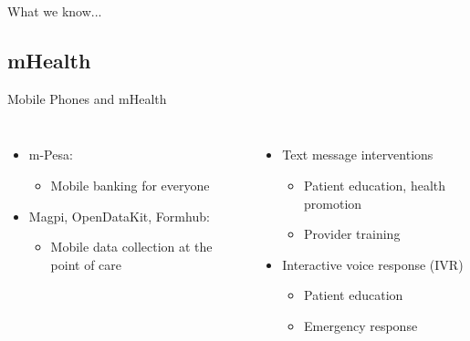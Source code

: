 \documentclass[xcolor=x11names, handout, compress]{beamer}
\renewcommand{\(}{\begin{columns}}
\renewcommand{\)}{\end{columns}}
\newcommand{\<}[1]{\begin{column}{#1}}
\renewcommand{\>}{\end{column}}
\begin{document}
\begin{frame}{What we know...}


\end{frame}

\subsection{mHealth}
\begin{frame}[t]{Mobile Phones and mHealth}
\begin{columns}[T]
\column{2in}
\begin{itemize}
	\item<1->{m-Pesa:}
		\begin{itemize}
		\item<1->{Mobile banking for everyone}
		\end{itemize}
	\item<2->{Magpi, OpenDataKit, Formhub:}
		\begin{itemize}
		\item<2->{Mobile data collection at the point of care}
		\end{itemize}
\end{itemize}
\column{2in}
\begin{itemize}
	\item<3->{Text message interventions}
		\begin{itemize}
		\item<3->{Patient education, health promotion}
		\item<3->{Provider training}
		\end{itemize}
	\item<4->{Interactive voice response (IVR)}
		\begin{itemize}
		\item<4->{Patient education}
		\item<4->{Emergency response}
		\end{itemize}
\end{itemize}
\end{columns}
\end{frame}
\end{document}
